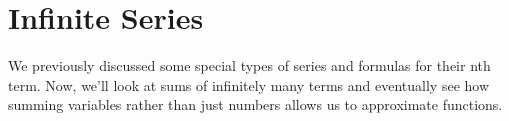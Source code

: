 \chapter{Infinite Series}
We previously discussed some special types of series and formulas for their nth term.
Now, we'll look at sums of infinitely many terms and eventually see how summing variables rather than just numbers allows us to approximate functions.





